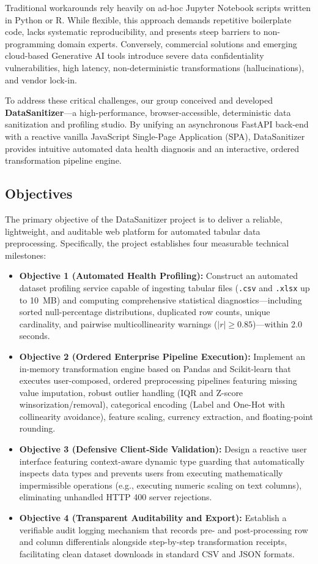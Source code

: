 Traditional workarounds rely heavily on ad-hoc Jupyter Notebook scripts written in Python or R. While flexible, this approach demands repetitive boilerplate code, lacks systematic reproducibility, and presents steep barriers to non-programming domain experts. Conversely, commercial solutions and emerging cloud-based Generative AI tools introduce severe data confidentiality vulnerabilities, high latency, non-deterministic transformations (hallucinations), and vendor lock-in.

To address these critical challenges, our group conceived and developed \textbf{DataSanitizer}—a high-performance, browser-accessible, deterministic data sanitization and profiling studio. By unifying an asynchronous FastAPI back-end with a reactive vanilla JavaScript Single-Page Application (SPA), DataSanitizer provides intuitive automated data health diagnosis and an interactive, ordered transformation pipeline engine.

\subsection{Objectives}
The primary objective of the DataSanitizer project is to deliver a reliable, lightweight, and auditable web platform for automated tabular data preprocessing. Specifically, the project establishes four measurable technical milestones:
\begin{itemize}
  \item \textbf{Objective 1 (Automated Health Profiling):} Construct an automated dataset profiling service capable of ingesting tabular files (\texttt{.csv} and \texttt{.xlsx} up to 10~MB) and computing comprehensive statistical diagnostics—including sorted null-percentage distributions, duplicated row counts, unique cardinality, and pairwise multicollinearity warnings ($|r| \ge 0.85$)—within 2.0 seconds.
  \item \textbf{Objective 2 (Ordered Enterprise Pipeline Execution):} Implement an in-memory transformation engine based on Pandas \cite{mckinney2010} and Scikit-learn \cite{pedregosa2011} that executes user-composed, ordered preprocessing pipelines featuring missing value imputation, robust outlier handling (IQR and Z-score winsorization/removal), categorical encoding (Label and One-Hot with collinearity avoidance), feature scaling, currency extraction, and floating-point rounding.
  \item \textbf{Objective 3 (Defensive Client-Side Validation):} Design a reactive user interface featuring context-aware dynamic type guarding that automatically inspects data types and prevents users from executing mathematically impermissible operations (e.g., executing numeric scaling on text columns), eliminating unhandled HTTP 400 server rejections.
  \item \textbf{Objective 4 (Transparent Auditability and Export):} Establish a verifiable audit logging mechanism that records pre- and post-processing row and column differentials alongside step-by-step transformation receipts, facilitating clean dataset downloads in standard CSV and JSON formats.
\end{itemize}

